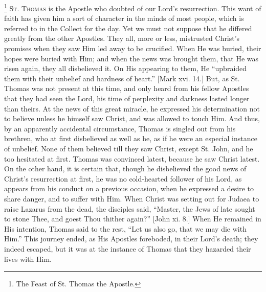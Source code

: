 \footnote{The Feast of St. Thomas the Apostle.} S\textsc{t}.
T\textsc{homas} is the
Apostle who doubted of our Lord's resurrection. This want of faith has
given him a sort of character in the minds of most people, which is
referred to in the Collect for the day. Yet we must not suppose that
he differed greatly from the other Apostles. They all, more or less,
mistrusted Christ's promises when they saw Him led away to be
crucified. When He was buried, their hopes were buried with Him; and
when the news was brought them, that He was risen again, they all
disbelieved it. On His appearing to them, He ``upbraided them with
their unbelief and hardness of heart.'' [Mark xvi. 14.] But, as
St. Thomas was not present at this time, and only heard from his
fellow Apostles that they had seen the Lord, his time of perplexity
and darkness lasted longer than theirs. At the news of this great
miracle, he expressed his determination not to believe unless he
himself saw Christ, and was allowed to touch Him. And thus, by an
apparently accidental circumstance, Thomas is singled out from his
brethren, who at first disbelieved as well as he, as if he were an
especial instance of unbelief. None of them believed till they saw
Christ, except St. John, and he too hesitated at first. Thomas was
convinced latest, because he saw Christ latest. On the other hand, it
is certain that, though he disbelieved the good news of Christ's
resurrection at first, he was no cold-hearted follower of his Lord, as
appears from his conduct on a previous occasion, when he expressed a
desire to share danger, and to suffer with Him. When Christ was
setting out for Judaea to raise Lazarus from the dead, the disciples
said, ``Master, the Jews of late sought to stone Thee, and goest
Thou thither again?'' [John xi. 8.] When He remained in His
intention, Thomas said to the rest, ``Let us also go, that we may
die with Him.'' This journey ended, as His Apostles foreboded, in
their Lord's death; they indeed escaped, but it was at the instance of
Thomas that they hazarded their lives with Him.

